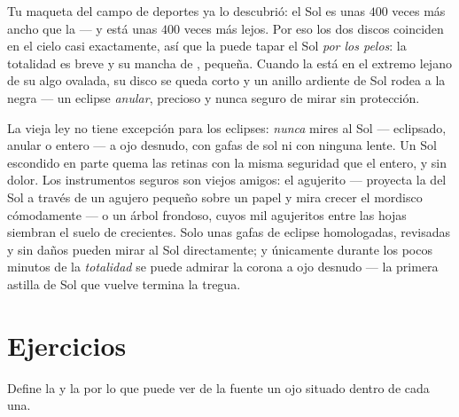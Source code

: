 \begin{example}\label{ex:g7:shadows-eclipses:coincidence}
Tu maqueta del campo de deportes ya lo descubrió: el Sol es unas $400$
veces más ancho que la  --- y está unas $400$ veces más lejos.
Por eso los dos discos coinciden en el cielo casi exactamente, así que
la  puede tapar el Sol \emph{por los pelos}: la totalidad es
breve y su mancha de , pequeña. Cuando la  está en el
extremo lejano de su  algo ovalada, su disco se queda corto y
un anillo ardiente de Sol rodea a la  negra --- un eclipse
\emph{anular}, precioso y nunca seguro de mirar sin protección.
\end{example}

\begin{remark}\label{rem:g7:shadows-eclipses:safety}
La vieja ley no tiene excepción para los eclipses: \emph{nunca} mires
al Sol --- eclipsado, anular o entero --- a ojo desnudo, con gafas de
sol ni con ninguna lente. Un Sol escondido en parte quema las retinas
con la misma seguridad que el entero, y sin dolor. Los instrumentos
seguros son viejos amigos: el agujerito --- proyecta la  del
Sol a través de un agujero pequeño sobre un papel y mira crecer el
mordisco cómodamente --- o un árbol frondoso, cuyos mil agujeritos
entre las hojas siembran el suelo de crecientes. Solo unas gafas de
eclipse homologadas, revisadas y sin daños pueden mirar al Sol
directamente; y únicamente durante los pocos minutos de la
\emph{totalidad} se puede admirar la corona a ojo desnudo --- la
primera astilla de Sol que vuelve termina la tregua.
\end{remark}

\section{Ejercicios}

\begin{exercise}[$\star$]\label{exo:g7:shadows-eclipses:1}
Define la  y la  por lo que puede ver de la fuente
un ojo situado dentro de cada una.
\end{exercise}

